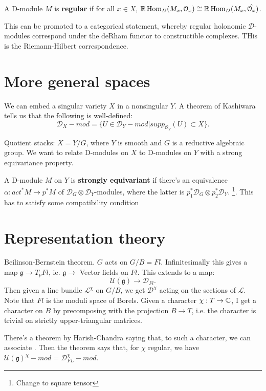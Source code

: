 \begin{defin}
A D-module $M$ is \textbf{regular} if for all $x\in X$, $\mathbb R \operatorname{Hom}_D(M_x, \mathcal{O}_x) \cong \mathbb R \operatorname{Hom}_D(M_x, \hat{\mathcal{O}_x})$.
\end{defin}

\begin{rem}
This can be promoted to a categorical statement, whereby regular holonomic $\mathcal{D}$-modules correspond under the deRham functor
to constructible complexes. THis is the Riemann-Hilbert correspondence.
\end{rem}


\section{More general spaces}
We can embed a singular variety $X$ in a nonsingular $Y$. A theorem of Kashiwara tells us that the following is well-defined:
\[	\mathcal{D}_X -mod = \{ U \in \mathcal{D}_Y -mod| supp_{\mathcal{O}_Y}(U) \subset X \}.	\]

Quotient stacks: $X = Y / G$, where $Y$ is smooth and $G$ is a reductive algebraic group. We want to relate D-modules on $X$
to D-modules on $Y$ with a strong equivariance property.

\begin{defin}
A D-module $M$ on $Y$ is \textbf{strongly equivariant} if there's an equivalence $\alpha : act^* M \to p^* M$ of
$\mathcal{D}_G \otimes \mathcal{D}_Y$-modules, where the latter is $p_1^* \mathcal{D}_G \otimes p_2^* \mathcal{D}_Y$.
\footnote{Change to square tensor}. This has to satisfy some compatibility condition 
\end{defin}


\section{Representation theory}
Beilinson-Bernstein theorem. $G$ acts on $G/B = Fl$. Infinitesimally this gives a map $\mathfrak g \to T_p Fl$, ie.
$\mathfrak g \to $ Vector fields on $Fl$. This extends to a map:
\[	\mathcal{U}(\mathfrak g) \to \mathcal{D}_{Fl}.	\]
Then given a line bundle $\mathcal{L}^{\chi}$ on $G/B$, we get $\mathcal{D}^{\chi}$ acting on the sections of $\mathcal{L}$.
Note that $Fl$ is the moduli space of Borels. Given a character $\chi : T \to \mathbb C$, I get a character on $B$ by
precomposing with the projection $B\to T$, i.e. the character is trivial on strictly upper-triangular matrices.

There's a theorem by Harish-Chandra saying that, to such a character, we can associate . Then the theorem says that,
for $\chi$ regular, we have $\mathcal{U}(\mathfrak g)^{\chi}-mod = \mathcal{D}_{FL}^{\chi} - mod$.


